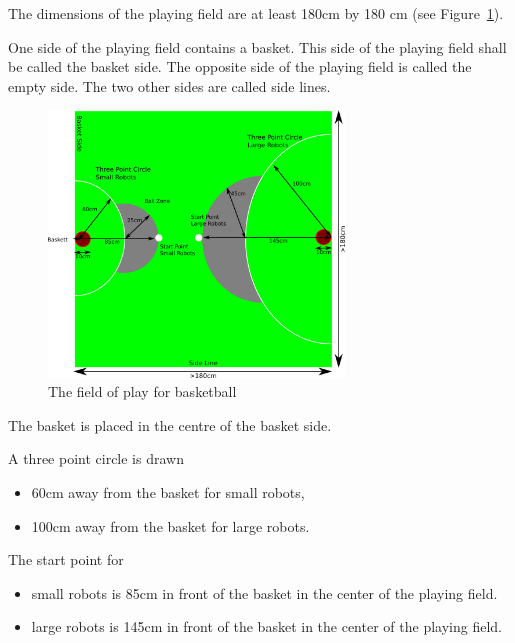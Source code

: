 \documentclass[12pt]{hurocup}
\begin{document}
\begin{lawlist}[BB]

\item The dimensions of the playing field are at least 180cm by
  180 cm (see Figure~\ref{fig:field-basketball}).

\item One side of the playing field contains a basket. This side of the
  playing field shall be called the basket side. The opposite side of
  the playing field is called the empty side. The two other sides are
  called side lines.

  \begin{figure}
    \begin{center}
      \includegraphics[width=0.7\textwidth]{Figures/basketball-field}
    \end{center}
    \caption{The field of play for basketball}
    \label{fig:field-basketball}
  \end{figure}

\item The basket is placed in the centre of the basket side.

\item A three point circle is drawn 
  \begin{itemize}
    \item 60cm away from the basket for small robots,
    \item 100cm away from the basket for large robots.
  \end{itemize}

\item The start point for
  \begin{itemize}
   \item small robots is 85cm in front of the basket in the center of
    the playing field. 
   \item large robots is 145cm in front of the basket in the center of
    the playing field.
  \end{itemize}


\end{lawlist}
\end{document}
